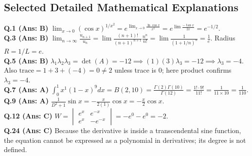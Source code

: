 \vspace{3mm}
\subsection*{Selected Detailed Mathematical Explanations}

\begin{solutionbox}
\textbf{Q.1 (Ans: B)} $\lim_{x\to 0} (\cos x)^{1/x^2} = e^{\lim_{x\to 0} \frac{\ln\cos x}{x^2}} = e^{\lim \frac{-\tan x}{2x}} = e^{-1/2}$.\\[2mm]
\textbf{Q.3 (Ans: B)} $\lim_{n\to\infty} \frac{u_{n+1}}{u_n} = \lim \frac{(n+1)!}{(n+1)^{n+1}} \frac{n^n}{n!} = \lim \frac{1}{(1 + 1/n)^n} = \frac{1}{e}$. Radius $R = 1/L = e$.\\[2mm]
\textbf{Q.5 (Ans: B)} $\lambda_1 \lambda_2 \lambda_3 = \det(A) = -12 \implies (1)(3)\lambda_3 = -12 \implies \lambda_3 = -4$. Also $\text{trace} = 1 + 3 + (-4) = 0 \neq 2$ unless trace is 0; here product confirms $\lambda_3 = -4$.\\[2mm]
\textbf{Q.7 (Ans: A)} $\int_0^1 x^1 (1-x)^9 dx = B(2, 10) = \frac{\Gamma(2)\Gamma(10)}{\Gamma(12)} = \frac{1! \cdot 9!}{11!} = \frac{1}{11 \times 10} = \frac{1}{110}$.\\[2mm]
\textbf{Q.9 (Ans: A)} $\frac{1}{D^2+1}\sin x = -\frac{x}{2(1)}\cos x = -\frac{x}{2}\cos x$.\\[2mm]
\textbf{Q.12 (Ans: C)} $W = \begin{vmatrix} e^x & e^{-x} \\ e^x & -e^{-x} \end{vmatrix} = -e^0 - e^0 = -2$.\\[2mm]
\textbf{Q.24 (Ans: C)} Because the derivative is inside a transcendental sine function, the equation cannot be expressed as a polynomial in derivatives; its degree is not defined.
\end{solutionbox}

\newpage
